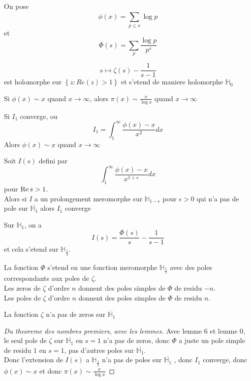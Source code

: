 \documentclass[../main.tex]{subfiles}
\begin{document}
On pose
\[ 
\phi( x) = \sum_{p \leq x}^{ } \log p
\]
et
\[ 
\Phi( s) = \sum_p \frac{\log p}{p^{s}}
\]
\begin{lemma}[0]
\[ 
s \mapsto \zeta( s) - \frac{1}{s-1}
\]
est holomorphe sur $ \left\{ z: Re( z) >1 \right\} $ et s'etend de maniere holomorphe $ \mathbb{H}_0$ 
\end{lemma}
\begin{lemma}[1]
Si $\phi( x) \sim x$ quand $x\to \infty $, alors $\pi( x) \sim \frac{x}{\log x }$ quand $x\to \infty $ 
\end{lemma}
\begin{lemma}[2]
Si $I_1$ converge, ou 
\[ 
I_1 = \int_{ 1 }^{ \infty  } \frac{\phi( x) -x}{x^{2}}dx
\]
Alors $\phi( x) \sim x$ quand $x\to \infty $ 

\end{lemma}
\begin{lemma}[3]
Soit $I( s)  $ defini par
\[ 
\int_{ 1 }^{ \infty  } \frac{\phi( x) -x}{x^{1+s}}dx
\]
pour $\operatorname{Re} s >1$.\\
Alors si $I$ a un prolongement meromorphe sur $ \mathbb{H}_{1-\epsilon}$ pour $\epsilon >0$ qui n'a pas de pole sur $ \overline{ \mathbb{H}_1}$ alors $I_1$ converge
\end{lemma}
\begin{lemma}[4]
Sur $ \mathbb{H}_{1} $, on a 
\[ 
I( s) = \frac{\Phi( s) }{s}- \frac{1}{s-1}
\]
et cela s'etend sur $\mathbb{H}_{\frac{1}{2}} $.

\end{lemma}
\begin{lemma}[5]
La fonction $\Phi$ s'etend en une fonction meromorphe $ \mathbb{H}_{\frac{1}{2}} $ avec des poles correspondants aux poles de $\zeta$.\\
Les zeros de $\zeta$ d'ordre $n$ donnent des poles simples de $\Phi$ de residu $-n$.\\
Les poles de $\zeta$ d'ordre $n$ donnent des poles simples de $\Phi$ de residu $n$.
\end{lemma}
\begin{lemma}[6]
La fonction $\zeta$ n'a pas de zeros sur $ \overline{\mathbb{H}_1}$ 
\end{lemma}
\begin{proof}[Du theoreme des nombres premiers, avec les lemmes]
	
Avec lemme 6 et lemme 0, le seul pole de $\zeta$ sur $ \overline{\mathbb{H}_1}$ en $s=1$ n'a pas de zeros, donc $\Phi$ a juste un pole simple de residu $1$ en $s=1$, pas d'autres poles sur $ \overline{\mathbb{H}_1}$.\\
Donc l'extension de $I( s) $ a $\mathbb{H}_{\frac{1}{2}} $ n'a pas de poles sur $ \overline{\mathbb{H}_1}$ , donc $I_1$ converge, donc $\phi( x) \sim x$ et donc $\pi( x) \sim \frac{x}{\log x}$ 
\end{proof}
\end{document}
